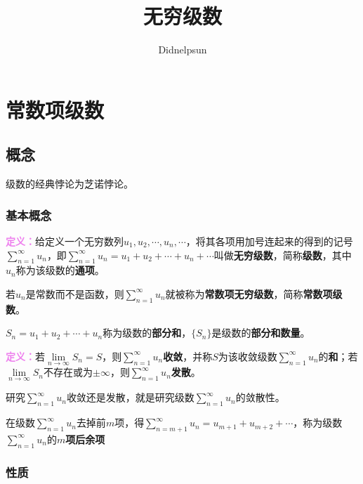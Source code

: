 \documentclass[UTF8, 12pt]{ctexart}
\author{Didnelpsun}
\title{无穷级数}
\date{}
\begin{document}
\maketitle
\pagestyle{empty}
\thispagestyle{empty}
\tableofcontents
\thispagestyle{empty}
\newpage
\pagestyle{plain}
\setcounter{page}{1}
\section{常数项级数}

\subsection{概念}

级数的经典悖论为芝诺悖论。

\subsubsection{基本概念}

\textcolor{violet}{\textbf{定义：}}给定义一个无穷数列$u_1,u_2,\cdots,u_n,\cdots$，将其各项用加号连起来的得到的记号$\sum\limits_{n=1}^\infty u_n$，即$\sum\limits_{n=1}^\infty u_n=u_1+u_2+\cdots+u_n+\cdots$叫做\textbf{无穷级数}，简称\textbf{级数}，其中$u_n$称为该级数的\textbf{通项}。

若$u_n$是常数而不是函数，则$\sum\limits_{n=1}^\infty u_n$就被称为\textbf{常数项无穷级数}，简称\textbf{常数项级数}。

$S_n=u_1+u_2+\cdots+u_n$称为级数的\textbf{部分和}，$\{S_n\}$是级数的\textbf{部分和数量}。

\textcolor{violet}{\textbf{定义：}}若$\lim\limits_{n\to\infty}S_n=S$，则$\sum\limits_{n=1}^\infty u_n$\textbf{收敛}，并称$S$为该收敛级数$\sum\limits_{n=1}^\infty u_n$的\textbf{和}；若$\lim\limits_{n\to\infty}S_n$不存在或为$\pm\infty$，则$\sum\limits_{n=1}^\infty u_n$\textbf{发散}。

研究$\sum\limits_{n=1}^\infty u_n$收敛还是发散，就是研究级数$\sum\limits_{n=1}^\infty u_n$的敛散性。

在级数$\sum\limits_{n=1}^\infty u_n$去掉前$m$项，得$\sum\limits_{n=m+1}^\infty u_n=u_{m+1}+u_{m+2}+\cdots$，称为级数$\sum\limits_{n=1}^\infty u_n$的\textbf{$m$项后余项}

\subsubsection{性质}
\end{document}
